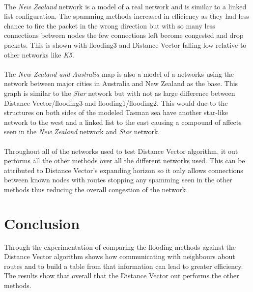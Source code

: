 \documentclass[11pt]{article}
\begin{document}
\paragraph{}

The \emph{New Zealand} network is a model of a real network and is similar to a
linked list configuration. The spamming methods increased in efficiency as they
had less chance to fire the packet in the wrong direction but with so many less
connections between nodes the few connections left become congested and drop
packets. This is shown with flooding3 and Distance Vector falling low relative
to other networks like \emph{K5}.

\paragraph{}

The \emph{New Zealand and Australia} map is also a model of a networks using
the network between major cities in Australia and New Zealand as the base. This
graph is similar to the \emph{Star} network but with not as large difference
between Distance Vector/flooding3 and flooding1/flooding2. This would due to
the structures on both sides of the modeled Tasman sea have another star-like
network to the west and a linked list to the east causing a compound of affects
seen in the \emph{New Zealand} network and \emph{Star} network.

\paragraph{}
Throughout all of the networks used to test Distance Vector algorithm, it out
performs all the  other methods over all the different networks used. This can
be attributed to Distance Vector's expanding horizon so it only allows connections
between known nodes with routes stopping any spamming seen in the other methods
thus reducing the overall congestion of the network.

\section*{Conclusion}

Through the experimentation of comparing the flooding methods against the
Distance Vector algorithm shows how communicating with neighbours about routes
and to build a table from that information can lead to greater efficiency.
The results show that overall that the Distance Vector out performs the other methods.
\end{document}
